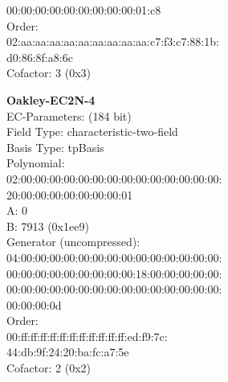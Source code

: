    00:00:00:00:00:00:00:00:00:01:c8\\
Order: \\
    02:aa:aa:aa:aa:aa:aa:aa:aa:aa:c7:f3:c7:88:1b:\\
    d0:86:8f:a8:6c\\
Cofactor:  3 (0x3)\\
\item \textbf{ Oakley-EC2N-4 }\\
EC-Parameters: (184 bit)\\
Field Type: characteristic-two-field\\
Basis Type: tpBasis\\
Polynomial:\\
    02:00:00:00:00:00:00:00:00:00:00:00:00:00:00:\\
    20:00:00:00:00:00:00:00:01\\
A:    0\\
B:    7913 (0x1ee9)\\
Generator (uncompressed):\\
    04:00:00:00:00:00:00:00:00:00:00:00:00:00:00:\\
    00:00:00:00:00:00:00:00:00:18:00:00:00:00:00:\\
    00:00:00:00:00:00:00:00:00:00:00:00:00:00:00:\\
    00:00:00:0d\\
Order: \\
    00:ff:ff:ff:ff:ff:ff:ff:ff:ff:ff:ff:ed:f9:7c:\\
    44:db:9f:24:20:ba:fc:a7:5e\\
Cofactor:  2 (0x2)\\
